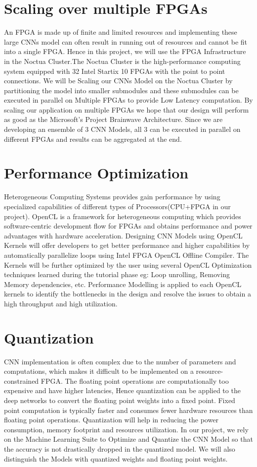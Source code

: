 \documentclass[titlepage]{report}
\begin{document}
\section{Scaling over multiple FPGAs}
An FPGA is made up of finite and limited resources and implementing these large CNNs model can often result in running out of resources and cannot be fit into a single FPGA. 
Hence in this project, we will use the FPGA Infrastructure in the Noctua Cluster.The Noctua Cluster is the high-performance computing system equipped with 32 Intel Startix 10 FPGAs with the point to point connections. 
We will be Scaling our CNNs Model on the Noctua Cluster by partitioning the model into smaller submodules and these submodules can be executed in parallel on Multiple FPGAs to provide Low Latency computation. 
By scaling our application on multiple FPGAs we hope that our design will perform as good as the Microsoft's Project Brainwave Architecture. Since we are developing an ensemble of 3 CNN Models, all 3 can be executed in parallel on different FPGAs and results can be aggregated at the end.

\section{Performance Optimization}
Heterogeneous Computing Systems provides gain performance by using specialized capabilities of different types of Processors(CPU+FPGA in our project). OpenCL is a framework for heterogeneous computing which provides software-centric development flow for FPGAs and obtains performance and power advantages with hardware acceleration. Designing CNN Models using OpenCL Kernels will offer developers to get better performance and higher capabilities by automatically parallelize loops using Intel FPGA OpenCL Offline Compiler. The Kernels will be further optimized by the user using several OpenCL Optimization techniques learned during the tutorial phase eg: Loop unrolling, Removing Memory dependencies, etc. Performance Modelling is applied to each OpenCL kernels to identify the bottlenecks in the design and resolve the issues to obtain a high throughput and high utilization.

\section{Quantization }
CNN implementation is often complex due to the number of parameters and computations, which makes it difficult to be implemented on a resource-constrained FPGA. The floating point operations are computationally too expensive and have higher latencies, Hence quantization can be applied to the deep networks to convert the floating point weights into a fixed point. Fixed point computation is typically faster and consumes fewer hardware resources than floating point operations. Quantization will help in reducing the power consumption, memory footprint and resources utilization. In our project, we rely on the Machine Learning Suite to Optimize and Quantize the CNN Model so that the accuracy is not drastically dropped in the quantized model. We will also distinguish the Models with quantized weights and floating point weights.
\end{document}
